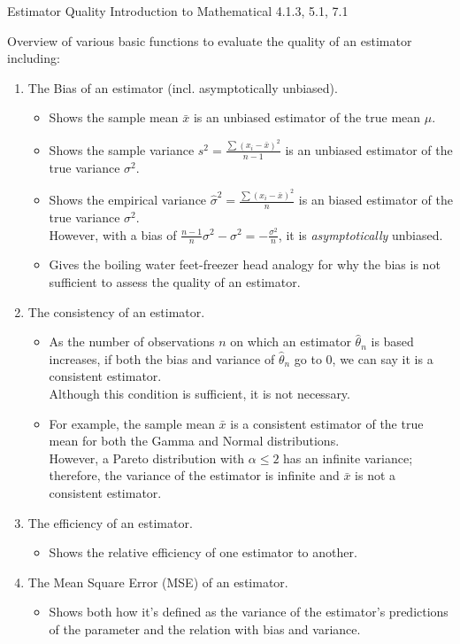 \begin{CHPT_SUMM_AUTO_NUMB}[label = {L.-25}]{Estimator Quality}
Introduction to Mathematical  4.1.3, 5.1, 7.1

\tcbline

Overview of various basic functions to evaluate the quality of an estimator including:
\begin{enumerate}[leftmargin = *]
	\item	The Bias of an estimator (incl. asymptotically unbiased).
		\begin{itemize}[leftmargin = *]
		\item	Shows the sample mean $\bar{x}$ is an unbiased estimator of the true mean $\mu$.
		\item	Shows the sample variance $s^{2} = \frac{\sum (x_{i} - \bar{x})^{2}}{n - 1}$ is an unbiased estimator of the true variance $\sigma^{2}$.
		\item	Shows the empirical variance $\hat{\sigma}^{2} = \frac{\sum (x_{i} - \bar{x})^{2}}{n}$ is an biased estimator of the true variance $\sigma^{2}$.	\\
				However, with a bias of $\frac{n - 1}{n}\sigma^{2} - \sigma^{2} = -\frac{\sigma^{2}}{n}$, it is \textit{asymptotically} unbiased.
		\item	Gives the boiling water feet-freezer head analogy for why the bias is not sufficient to assess the quality of an estimator.
		\end{itemize}
	\item	The consistency of an estimator.
		\begin{itemize}[leftmargin = *]
		\item	As the number of observations $n$ on which an estimator $\hat{\theta}_{n}$ is based increases, if both the bias and variance of $\hat{\theta}_{n}$ go to 0, we can say it is a consistent estimator.	\\
				Although this condition is sufficient, it is not necessary.
		\item	For example, the sample mean $\bar{x}$ is a consistent estimator of the true mean for both the Gamma and Normal distributions.	\\
				However, a Pareto distribution with $\alpha \leq 2$ has an infinite variance; therefore, the variance of the estimator is infinite and $\bar{x}$ is not a consistent estimator.
		\end{itemize}
	\item	The efficiency of an estimator.
		\begin{itemize}[leftmargin = *]
		\item	Shows the relative efficiency of one estimator to another.
		\end{itemize}
	\item	The Mean Square Error (MSE) of an estimator.
		\begin{itemize}[leftmargin = *]
		\item	Shows both how it's defined as the variance of the estimator's predictions of the parameter and the relation with bias and variance.
		\end{itemize}
\end{enumerate}


\end{CHPT_SUMM_AUTO_NUMB}
